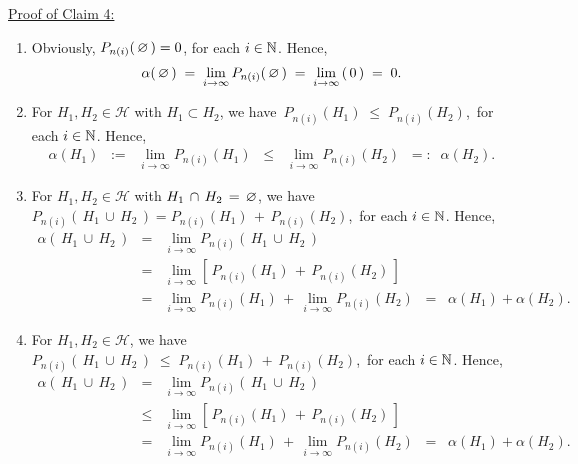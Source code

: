 \vskip 0.5cm
\noindent
\underline{Proof of Claim 4:}\quad
\begin{enumerate}
\item	Obviously, $P_{n(i)}(\,\varnothing\,) = 0$, for each $i\in\mathbb{N}$.
		Hence,
		\begin{equation*}
		\alpha(\,\varnothing\,)
		\;=\; \lim_{i\rightarrow\infty}P_{n(i)}(\,\varnothing\,)
		\;=\; \lim_{i\rightarrow\infty}\left(\,0\,\right)
		\;=\; 0.
		\end{equation*}
\item	For $H_{1}, H_{2} \in \mathcal{H}$ with $H_{1}\subset H_{2}$,
		we have \,$P_{n(i)}(H_{1}) \;\leq\; P_{n(i)}(H_{2})$,\, for each $i \in \mathbb{N}$.
		Hence,
		\begin{eqnarray*}
		\alpha(H_{1})
		\;\; := \;\; \lim_{i\rightarrow\infty}P_{n(i)}(H_{1})
		\;\;\leq\;\; \lim_{i\rightarrow\infty}P_{n(i)}(H_{2})
		\;\; =: \;\; \alpha(H_{2}).
		\end{eqnarray*}
\item	For $H_{1}, H_{2} \in \mathcal{H}$ with $H_{1}\,\cap\,H_{2}\,=\,\varnothing$,
		we have \,$P_{n(i)}(\,H_{1}\,\cup\,H_{2}\,) = P_{n(i)}(H_{1}) \,+\, P_{n(i)}(H_{2})$,\,
		for each $i \in \mathbb{N}$. Hence,
		\begin{eqnarray*}
		\alpha(\,H_{1}\,\cup\,H_{2}\,)
		&=& \lim_{i\rightarrow\infty}P_{n(i)}\!\left(\,H_{1}\,\cup\,H_{2}\,\right)
		\\
		&=& \lim_{i\rightarrow\infty}\left[\,P_{n(i)}\!\left(H_{1}\right) \,+\, P_{n(i)}\!\left(H_{2}\right) \,\right]
		\\
		&=& \lim_{i\rightarrow\infty}P_{n(i)}\!\left(H_{1}\right) \,+\, \lim_{i\rightarrow\infty}P_{n(i)}\!\left(H_{2}\right) 
		\;\;=\;\; \alpha(H_{1}) + \alpha(H_{2}).
		\end{eqnarray*}
\item	For $H_{1}, H_{2} \in \mathcal{H}$,
		we have \,$P_{n(i)}(\,H_{1}\,\cup\,H_{2}\,) \;\leq\; P_{n(i)}(H_{1}) \,+\, P_{n(i)}(H_{2})$,\,
		for each $i \in \mathbb{N}$. Hence,
		\begin{eqnarray*}
		\alpha(\,H_{1}\,\cup\,H_{2}\,)
		&=& \lim_{i\rightarrow\infty}P_{n(i)}\!\left(\,H_{1}\,\cup\,H_{2}\,\right)
		\\
		&\leq& \lim_{i\rightarrow\infty}\left[\,P_{n(i)}\!\left(H_{1}\right) \,+\, P_{n(i)}\!\left(H_{2}\right) \,\right]
		\\
		&=& \lim_{i\rightarrow\infty}P_{n(i)}\!\left(H_{1}\right) \,+\, \lim_{i\rightarrow\infty}P_{n(i)}\!\left(H_{2}\right) 
		\;\;=\;\; \alpha(H_{1}) + \alpha(H_{2}).
		\end{eqnarray*}
\end{enumerate}

